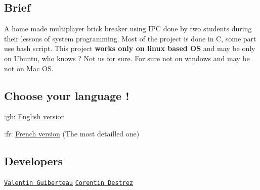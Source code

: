 

\subsection*{Brief}

A home made multiplayer brick breaker using I\+PC done by two students during their lessons of system programming. Most of the project is done in C, some part use bash script. This project {\bfseries works only on linux based OS} and may be only on Ubuntu, who knows ? Not us for sure. For sure not on windows and may be not on Mac OS.

\subsection*{Choose your language !}


\begin{DoxyItemize}
\item \+:gb\+: \hyperlink{_r_e_a_d_m_e_8en_8md}{English version}
\item \+:fr\+: \hyperlink{_r_e_a_d_m_e_8fr_8md}{French version} (The most detailled one)
\end{DoxyItemize}

\subsection*{Developers}

\href{https://github.com/ValentinIG2I}{\tt Valentin Guiberteau} \href{https://github.com/Lafie-rage}{\tt Corentin Destrez}

 